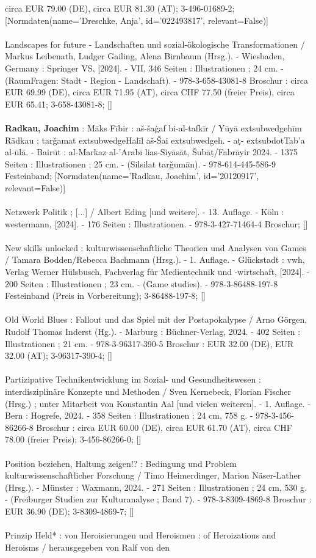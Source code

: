 \documentclass{article}
\begin{document}
\begin{multicols}{3}
circa EUR 79.00 (DE), circa EUR 81.30 (AT); 3-496-01689-2; [Normdaten(name='Dreschke, Anja', id='022493817', relevant=False)]\\\\Landscapes for future - Landschaften und sozial-ökologische Transformationen / Markus Leibenath, Ludger Gailing, Alena Birnbaum (Hrsg.). - Wiesbaden, Germany : Springer VS, [2024]. - VII, 346 Seiten : Illustrationen ; 24 cm. - (RaumFragen: Stadt - Region - Landschaft). - 978-3-658-43081-8 Broschur : circa EUR 69.99 (DE), circa EUR 71.95 (AT), circa CHF 77.50 (freier Preis), circa EUR 65.41; 3-658-43081-8; []\\\\\textbf{Radkau, Joachim} : Māks Fībir : aš-šaġaf bi-al-tafkīr / Yūyā	extsubwedge{h}īm Rādkau ; tarǧamat 	extsubwedge{H}alīl aš-Šai	extsubwedge{h}. - aṭ-	extsubdot{T}ab'a al-ūlā. - Bairūt : al-Markaz al-'Arabī lias-Siyāsāt, Šubāṭ/Fabrāyir 2024. - 1375 Seiten : Illustrationen ; 25 cm. - (Silsilat tarǧumān). - 978-614-445-586-9 Festeinband; [Normdaten(name='Radkau, Joachim', id='20120917', relevant=False)]\\\\Netzwerk Politik ; [...] / Albert Eding [und weitere]. - 13. Auflage. - Köln : westermann, [2024]. - 176 Seiten : Illustrationen. - 978-3-427-71464-4 Broschur; []\\\\New skills unlocked : kulturwissenschaftliche Theorien und Analysen von Games / Tamara Bodden/Rebecca Bachmann (Hrsg.). - 1. Auflage. - Glückstadt : vwh, Verlag Werner Hülsbusch, Fachverlag für Medientechnik und -wirtschaft, [2024]. - 200 Seiten : Illustrationen ; 23 cm. - (Game studies). - 978-3-86488-197-8 Festeinband (Preis in Vorbereitung); 3-86488-197-8; []\\\\Old World Blues : Fallout und das Spiel mit der Postapokalypse / Arno Görgen, Rudolf Thomas Inderst (Hg.). - Marburg : Büchner-Verlag, 2024. - 402 Seiten : Illustrationen ; 21 cm. - 978-3-96317-390-5 Broschur : EUR 32.00 (DE), EUR 32.00 (AT); 3-96317-390-4; []\\\\Partizipative Technikentwicklung im Sozial- und Gesundheitswesen : interdisziplinäre Konzepte und Methoden / Sven Kernebeck, Florian Fischer (Hrsg.) ; unter Mitarbeit von Konstantin Aal [und vielen weiteren]. - 1. Auflage. - Bern : Hogrefe, 2024. - 358 Seiten : Illustrationen ; 24 cm, 758 g. - 978-3-456-86266-8 Broschur : circa EUR 60.00 (DE), circa EUR 61.70 (AT), circa CHF 78.00 (freier Preis); 3-456-86266-0; []\\\\Position beziehen, Haltung zeigen!? : Bedingung und Problem kulturwissenschaftlicher Forschung / Timo Heimerdinger, Marion Näser-Lather (Hrsg.). - Münster : Waxmann, 2024. - 271 Seiten : Illustrationen ; 24 cm, 530 g. - (Freiburger Studien zur Kulturanalyse ; Band 7). - 978-3-8309-4869-8 Broschur : EUR 36.90 (DE); 3-8309-4869-7; []\\\\Prinzip Held* : von Heroisierungen und Heroismen : of Heroizations and Heroisms / herausgegeben von Ralf von den 
\end{multicols}
\end{document}
